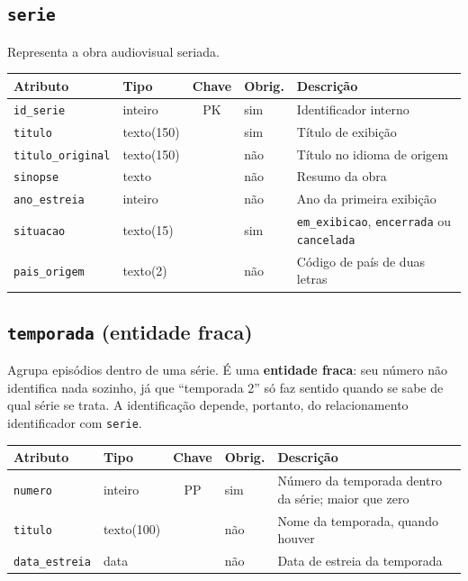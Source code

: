 \documentclass[a4paper,12pt,oneside,openany]{book}
\newcommand{\id}[1]{\texttt{#1}}
\begin{document}
\subsection{\id{serie}}

Representa a obra audiovisual seriada.

\begin{table}[H]
\centering
\small
\begin{tabularx}{\textwidth}{@{}llclX@{}}
\toprule
\textbf{Atributo} & \textbf{Tipo} & \textbf{Chave} & \textbf{Obrig.} & \textbf{Descrição} \\
\midrule
\id{id\_serie} & inteiro & PK & sim & Identificador interno \\
\id{titulo} & texto(150) & & sim & Título de exibição \\
\id{titulo\_original} & texto(150) & & não & Título no idioma de origem \\
\id{sinopse} & texto & & não & Resumo da obra \\
\id{ano\_estreia} & inteiro & & não & Ano da primeira exibição \\
\id{situacao} & texto(15) & & sim & \id{em\_exibicao}, \id{encerrada} ou \id{cancelada} \\
\id{pais\_origem} & texto(2) & & não & Código de país de duas letras \\
\bottomrule
\end{tabularx}
\end{table}

\subsection{\id{temporada} (entidade fraca)}

Agrupa episódios dentro de uma série. É uma \textbf{entidade fraca}: seu número não
identifica nada sozinho, já que ``temporada 2'' só faz sentido quando se sabe de
qual série se trata. A identificação depende, portanto, do relacionamento
identificador com \id{serie}.

\begin{table}[H]
\centering
\small
\begin{tabularx}{\textwidth}{@{}llclX@{}}
\toprule
\textbf{Atributo} & \textbf{Tipo} & \textbf{Chave} & \textbf{Obrig.} & \textbf{Descrição} \\
\midrule
\id{numero} & inteiro & PP & sim & Número da temporada dentro da série; maior que zero \\
\id{titulo} & texto(100) & & não & Nome da temporada, quando houver \\
\id{data\_estreia} & data & & não & Data de estreia da temporada \\
\bottomrule
\end{tabularx}
\end{table}
\end{document}
